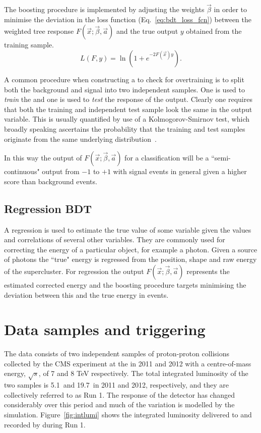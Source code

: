 The boosting procedure is implemented by adjusting the weights $\vec{\beta}$ in order to minimise the deviation in the loss function (Eq.~\ref{eq:bdt_loss_fcn}) between the weighted tree response $F(\vec{x};\vec{\beta},\vec{a})$ and the true output $y$ obtained from the training sample. 
\begin{equation}
  L(F,y) = \ln(1+e^{-2F(\vec{x})y}).
  \label{eq:bdt_loss_fcn}
\end{equation}

A common procedure when constructing a \BDT to check for overtraining is to split both the background and signal into two independent samples. One is used to \emph{train} the \BDT and one is used to \emph{test} the response of the output. Clearly one requires that both the training and independent test sample look the same in the output variable. This is usually quantified by use of a Kolmogorov-Smirnov test, which broadly speaking ascertains the probability that the training and test samples originate from the same underlying distribution~\cite{kol_smir}. 

In this way the output of $F(\vec{x};\vec{\beta},\vec{a})$ for a classification \BDT will be a ``semi-continuous" output from $-1$ to $+1$ with signal events in general given a higher score than background events.

\subsection{Regression \acs{BDT}}
A regression \BDT is used to estimate the true value of some variable given the values and correlations of several other variables. They are commonly used for correcting the energy of a particular object, for example a photon. Given a \MC source of photons the ``true" energy is regressed from the position, shape and raw energy of the supercluster. For regression \BDTs the output $F(\vec{x};\vec{\beta},\vec{a})$ represents the estimated corrected energy and the boosting procedure targets minimising the deviation between this and the true energy in \MC events. 

\section{Data samples and triggering}

The data consists of two independent samples of proton-proton collisions collected by the CMS experiment at the \LHC in 2011 and 2012 with a centre-of-mass energy, $\sqrt{s}$, of 7 and 8 TeV respectively. The total integrated luminosity of the two samples is 5.1~\fb and 19.7~\fb in 2011 and 2012, respectively, and they are collectively referred to as \LHC Run 1. The response of the detector has changed considerably over this period and much of the variation is modelled by the \MC simulation. Figure~\ref{fig:intlumi} shows the integrated luminosity delivered to and recorded by \CMS during \LHC Run 1.

